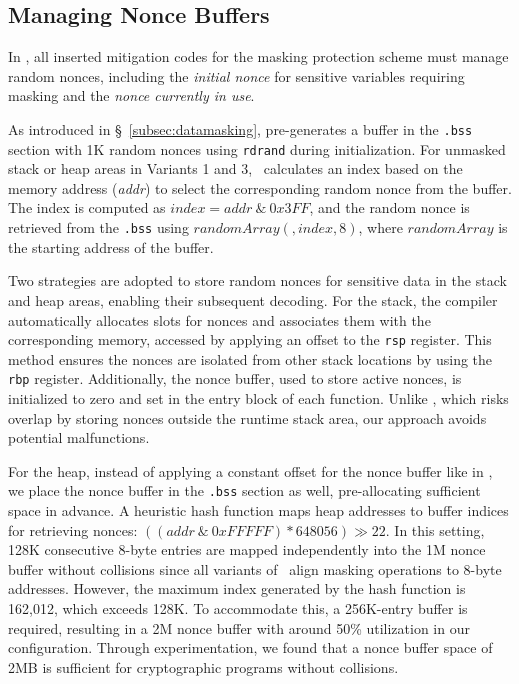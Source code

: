 \subsection{Managing Nonce Buffers}
\label{subsec:buffermanage}

In \tool, all inserted mitigation codes for the masking protection scheme must manage random nonces, including the \textit{initial nonce} for sensitive variables requiring masking and the \textit{nonce currently in use}.

As introduced in \S~\ref{subsec:datamasking}, \tool pre-generates a buffer in the \texttt{.bss} section with 1K random nonces using \texttt{rdrand} during initialization. 
For unmasked stack or heap areas in Variants 1 and 3, \tool\ calculates an index based on the memory address (\textit{addr}) to select the corresponding random nonce from the buffer. 
The index is computed as $index = addr\ \&\ 0x3FF$, and the random nonce is retrieved from the \texttt{.bss} using $randomArray(, index, 8)$, where $randomArray$ is the starting address of the buffer.

Two strategies are adopted to store random nonces for sensitive data in the stack and heap areas, enabling their subsequent decoding.
For the stack, the compiler automatically allocates slots for nonces and associates them with the corresponding memory, accessed by applying an offset to the \texttt{rsp} register.
This method ensures the nonces are isolated from other stack locations by using the \texttt{rbp} register. 
Additionally, the nonce buffer, used to store active nonces, is initialized to zero and set in the entry block of each function.
Unlike \ftool, which risks overlap by storing nonces outside the runtime stack area, our approach avoids potential malfunctions.

For the heap, instead of applying a constant offset for the nonce buffer like in \ftool, we place the nonce buffer in the \texttt{.bss} section as well, pre-allocating sufficient space in advance. 
A heuristic hash function maps heap addresses to buffer indices for retrieving nonces: $((addr\ \&\ 0xFFFFF) * 648056) \gg 22$.
In this setting, 128K consecutive 8-byte entries are mapped independently into the 1M nonce buffer without collisions since all variants of \tool\ align masking operations to 8-byte addresses. 
However, the maximum index generated by the hash function is 162,012, which exceeds 128K. To accommodate this, a 256K-entry buffer is required, resulting in a 2M nonce buffer with around 50\% utilization in our configuration.
Through experimentation, we found that a nonce buffer space of 2MB is sufficient for cryptographic programs without collisions.

